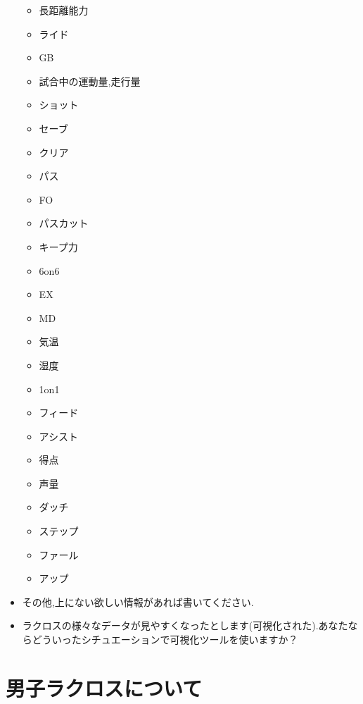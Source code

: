 \documentclass[sotsuron]{kuee}
\begin{document}
\begin{itemize}
\begin{itemize}
				\item 長距離能力
				\item ライド
				\item GB
				\item 試合中の運動量,走行量
				\item ショット
				\item セーブ
				\item クリア
				\item パス
				\item FO
				\item パスカット
				\item キープ力
				\item 6on6
				\item EX
				\item MD
				\item 気温
				\item 湿度
				\item 1on1
				\item フィード
				\item アシスト
				\item 得点
				\item 声量
				\item ダッチ
				\item ステップ
				\item ファール
				\item アップ
			\end{itemize}
		\item その他,上にない欲しい情報があれば書いてください.
		\item ラクロスの様々なデータが見やすくなったとします(可視化された).あなたならどういったシチュエーションで可視化ツールを使いますか？
	\end{itemize}

\chapter{男子ラクロスについて}
\end{document}
